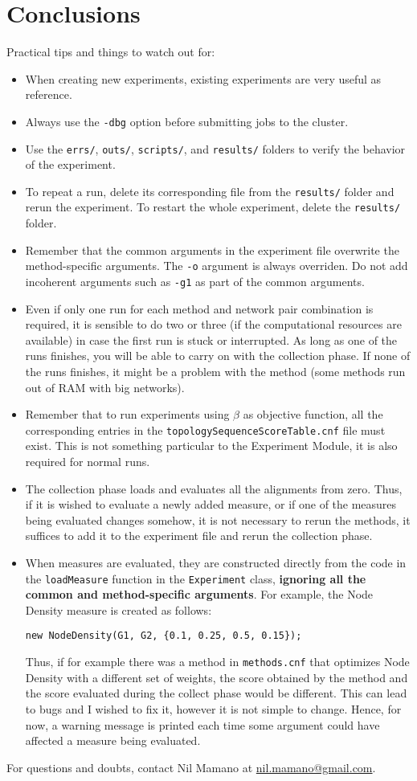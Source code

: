 \documentclass[]{article}
\begin{document}
\section{Conclusions}
Practical tips and things to watch out for:
\begin{itemize}
\item When creating new experiments, existing experiments are very useful as reference.
\item Always use the \verb|-dbg| option before submitting jobs to the cluster.
\item Use the \verb|errs/|, \verb|outs/|, \verb|scripts/|, and \verb|results/| folders to verify the behavior of the experiment.
\item To repeat a run, delete its corresponding file from the \verb|results/| folder and rerun the experiment. To restart the whole experiment, delete the \verb|results/| folder.
\item Remember that the common arguments in the experiment file overwrite the method-specific arguments. The \verb|-o| argument is always overriden. Do not add incoherent arguments such as \verb|-g1| as part of the common arguments.
\item Even if only one run for each method and network pair combination is required, it is sensible to do two or three (if the computational resources are available) in case the first run is stuck or interrupted. As long as one of the runs finishes, you will be able to carry on with the collection phase. If none of the runs finishes, it might be a problem with the method (some methods run out of RAM with big networks).
\item Remember that to run experiments using $\beta$ as objective function, all the corresponding entries in the \verb|topologySequenceScoreTable.cnf| file must exist. This is not something particular to the Experiment Module, it is also required for normal runs.
\item The collection phase loads and evaluates all the alignments from zero. Thus, if it is wished to evaluate a newly added measure, or if one of the measures being evaluated changes somehow, it is not necessary to rerun the methods, it suffices to add it to the experiment file and rerun the collection phase.
\item When measures are evaluated, they are constructed directly from the code in the \verb|loadMeasure| function in the \verb|Experiment| class, \textbf{ignoring all the common and method-specific arguments}. For example, the Node Density measure is created as follows:
\begin{verbatim}
new NodeDensity(G1, G2, {0.1, 0.25, 0.5, 0.15});
\end{verbatim}
Thus, if for example there was a method in \verb|methods.cnf| that optimizes Node Density with a different set of weights, the score obtained by the method and the score evaluated during the collect phase would be different. This can lead to bugs and I wished to fix it, however it is not simple to change. Hence, for now, a warning message is printed each time some argument could have affected a measure being evaluated.
\end{itemize}
For questions and doubts, contact Nil Mamano at \url{nil.mamano@gmail.com}.
\end{document}
